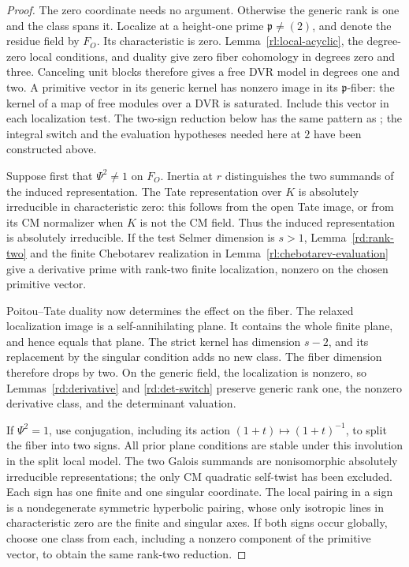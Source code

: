 \begin{proof}
The zero coordinate needs no argument.  Otherwise the generic
rank is one and the class spans it.  Localize at a height-one prime
\(\mathfrak p\ne(2)\), and denote the residue field by \(F_O\).
Its characteristic is zero.  Lemma~\ref{rl:local-acyclic}, the
degree-zero local conditions, and duality give zero fiber
cohomology in degrees zero and three.  Canceling unit blocks
therefore gives a free DVR model in degrees one and two.
A primitive vector in its generic kernel has nonzero image in its
\(\mathfrak p\)-fiber: the kernel of a map of free modules over a
DVR is saturated.  Include this vector in each localization test.
The two-sign reduction below has the same pattern as
\cite[Lemmas~1.5.3 and~1.6.4]{Howard2012}; the integral switch
and the evaluation hypotheses needed here at \(2\) have been
constructed above.

Suppose first that \(\Psi^2\ne1\) on \(F_O\).  Inertia at \(r\)
distinguishes the two summands of the induced representation.
The Tate representation over \(K\) is absolutely irreducible in
characteristic zero: this follows from the open Tate image, or
from its CM normalizer when \(K\) is not the CM field.
Thus the induced representation is absolutely irreducible.
If the test Selmer dimension is \(s>1\), Lemma~\ref{rd:rank-two}
and the finite Chebotarev realization in Lemma~\ref{rl:chebotarev-evaluation}
give a derivative prime with rank-two finite localization,
nonzero on the chosen primitive vector.

Poitou--Tate duality now determines the effect on the fiber.
The relaxed localization image is a self-annihilating plane.
It contains the whole finite plane, and hence equals that plane.
The strict kernel has dimension \(s-2\), and its replacement by
the singular condition adds no new class.  The fiber dimension
therefore drops by two.  On the generic field, the localization
is nonzero, so Lemmas~\ref{rd:derivative} and
\ref{rd:det-switch} preserve generic rank one, the nonzero
derivative class, and the determinant valuation.

If \(\Psi^2=1\), use conjugation, including its action
\((1+t)\mapsto(1+t)^{-1}\), to split the fiber into two signs.
All prior plane conditions are stable under this involution in
the split local model.  The two Galois summands are nonisomorphic
absolutely irreducible representations; the only CM quadratic
self-twist has been excluded.  Each sign has one finite and one
singular coordinate.  The local pairing in a sign is a
nondegenerate symmetric hyperbolic pairing, whose only isotropic
lines in characteristic zero are the finite and singular axes.
If both signs occur globally, choose one class from each, including
a nonzero component of the primitive vector, to obtain the same
rank-two reduction.


\end{proof}
